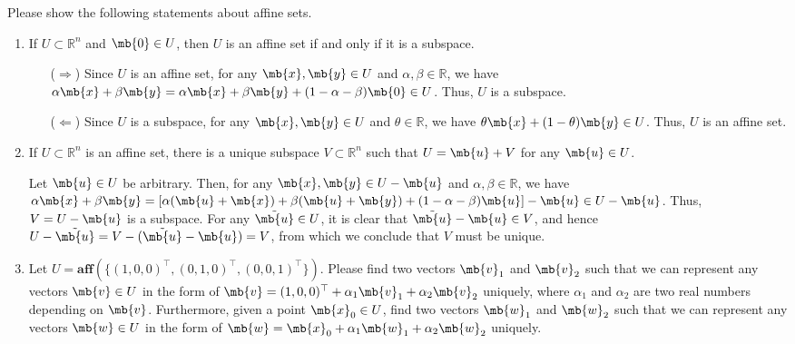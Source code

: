 \begin{exercise}
\begin{enumerate}
  \end{enumerate}

\end{exercise}
\newpage



\begin{exercise}
  Please show the following statements about affine sets.
  \begin{enumerate}
    \item
      If $U\subset\mathbb{R}^n$ and $\mb{0}\in U$, then $U$ is an affine set if and only if it is a subspace.

      \begin{solution}
        \begin{itemize}
          \item []
          \item [($\Rightarrow$)]
            Since $U$ is an affine set, for any $\mb{x}, \mb{y}\in U$ and $\alpha,\beta \in \mathbb{R}$, we have $\alpha \mb{x} + \beta \mb{y} = \alpha \mb{x} + \beta \mb{y} + (1- \alpha - \beta)\mb{0}\in U$. Thus, $U$ is a subspace.
          \item [($\Leftarrow$)]
            Since $U$ is a subspace, for any $\mb{x}, \mb{y}\in U$ and $\theta \in \mathbb{R}$, we have $\theta \mb{x} + (1-\theta) \mb{y} \in U$. Thus, $U$ is an affine set.
            \qedhere
        \end{itemize}
      \end{solution}
    \item
      If $U\subset\mathbb{R}^n$ is an affine set, there is a unique subspace $V\subset\mathbb{R}^n$ such that $U=\mb{u}+V$ for any $\mb{u} \in U$.

      \begin{solution}
        Let $\mb{u}\in U$ be arbitrary. Then, for any $\mb{x}, \mb{y}\in U - \mb{u}$ and $\alpha,\beta \in \mathbb{R}$, we have $\alpha \mb{x} + \beta \mb{y} = \left[\alpha (\mb{u}+\mb{x}) + \beta (\mb{u}+\mb{y}) + (1- \alpha - \beta)\mb{u}\right] - \mb{u}\in U - \mb{u}$. Thus, $V = U-\mb{u}$ is a subspace. For any $\tilde{\mb{u}} \in U$, it is clear that $\tilde{\mb{u}} - \mb{u} \in V$, and hence $U - \tilde{\mb{u}} = V - (\tilde{\mb{u}} - \mb{u}) = V$, from which we conclude that $V$ must be unique.
      \end{solution}
    \item 
      Let $U=\textbf{aff}(\{(1,0,0)^\top, (0,1,0)^\top,(0,0,1)^\top\})$. Please find two vectors $\mb{v}_1$ and $\mb{v}_2$ such that we can represent any vectors $\mb{v}\in U$ in the form of $\mb{v}=(1,0,0)^\top+\alpha_1 \mb{v}_1+\alpha_2 \mb{v}_2$ uniquely, where $\alpha_1$ and $\alpha_2$ are two real numbers depending on $\mb{v}$. Furthermore, given a point $\mb{x}_0\in U$, find two vectors $\mb{w}_1$ and $\mb{w}_2$ such that we can represent any vectors $\mb{w}\in U$ in the form of $\mb{w}=\mb{x}_0+\alpha_1 \mb{w}_1+\alpha_2 \mb{w}_2$ uniquely.


\end{enumerate}
\end{exercise}
